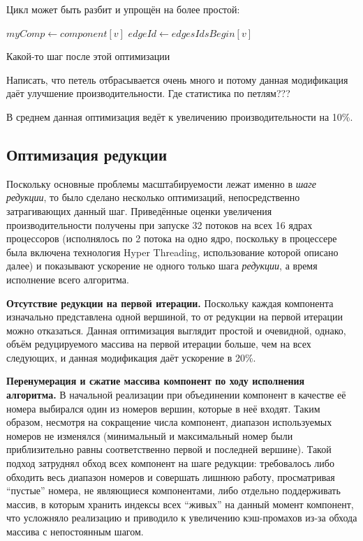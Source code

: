 \documentclass[a4paper,10pt]{extarticle}
\begin{document}
Цикл может быть разбит и упрощён на более простой:

\begin{algorithm}
    \SetAlgoLined
    $myComp \gets component[v]$\;
    $edgeId \gets edgesIdsBegin[v]$\;
    \caption{Какой-то шаг после этой оптимизации}
\end{algorithm}

Написать, что петель отбрасывается очень много и потому данная модификация даёт улучшение производительности. Где статистика по петлям???

В среднем данная оптимизация ведёт к увеличению производительности на 10\%.


\subsection{Оптимизация редукции}

Поскольку основные проблемы масштабируемости лежат именно в \textit{шаге редукции}, то было сделано несколько оптимизаций, непосредственно затрагивающих данный шаг. 
Приведённые оценки увеличения производительности получены при запуске 32 потоков на всех 16 ядрах процессоров (исполнялось по 2 потока на одно ядро, поскольку в процессере была включена технология Hyper Threading, использование которой описано далее)
и показывают ускорение не одного только шага \textit{редукции}, а время исполнение всего алгоритма.

\textbf{Отсутствие редукции на первой итерации.}
Поскольку каждая компонента изначально представлена одной вершиной, то от редукции на первой итерации можно отказаться. Данная оптимизация выглядит простой и очевидной, однако, объём редуцируемого массива на первой итерации больше, чем на всех следующих, и данная модификация даёт ускорение в 20\%.

\textbf{Перенумерация и сжатие массива компонент по ходу исполнения алгоритма.}
В начальной реализации при объединении компонент в качестве её номера выбирался один из номеров вершин, которые в неё входят. Таким образом, несмотря на сокращение числа компонент, диапазон используемых номеров не изменялся (минимальный и максимальный номер были приблизительно равны соответственно первой и последней вершине). Такой подход затруднял обход всех компонент на шаге редукции: требовалось либо обходить весь диапазон номеров и совершать лишнюю работу, просматривая ``пустые'' номера, не являющиеся компонентами, либо отдельно поддерживать массив, в которым хранить индексы всех ``живых'' на данный момент компонент, что усложняло реализацию и приводило к увеличению кэш-промахов из-за обхода массива с непостоянным шагом.
\end{document}
